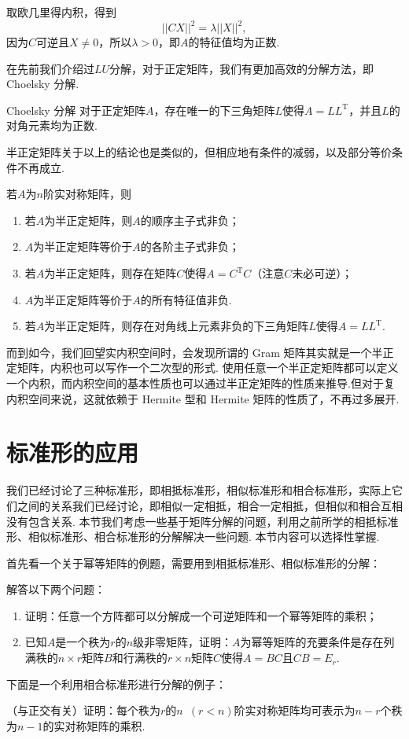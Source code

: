 取欧几里得内积，得到
\[||CX||^2 = \lambda ||X||^2,\]
因为$C$可逆且$X \neq 0$，所以$\lambda > 0$，即$A$的特征值均为正数.

在先前我们介绍过$LU$分解，对于正定矩阵，我们有更加高效的分解方法，即 Choelsky 分解.

\begin{theorem}{}{Choelsky 分解}
    对于正定矩阵$A$，存在唯一的下三角矩阵$L$使得$A=LL^\mathrm{T}$，并且$L$的对角元素均为正数.
\end{theorem}

半正定矩阵关于以上的结论也是类似的，但相应地有条件的减弱，以及部分等价条件不再成立.
\begin{theorem}{}{}
    若$A$为$n$阶实对称矩阵，则
    \begin{enumerate}
        \item 若$A$为半正定矩阵，则$A$的顺序主子式非负；
        \item $A$为半正定矩阵等价于$A$的各阶主子式非负；
        \item 若$A$为半正定矩阵，则存在矩阵$C$使得$A=C^{\mathrm{T}}C$（注意$C$未必可逆）；
        \item $A$为半正定矩阵等价于$A$的所有特征值非负.
        \item 若$A$为半正定矩阵，则存在对角线上元素非负的下三角矩阵$L$使得$A=LL^{\mathrm{T}}$.
    \end{enumerate}
\end{theorem}

而到如今，我们回望实内积空间时，会发现所谓的 Gram 矩阵其实就是一个半正定矩阵，内积也可以写作一个二次型的形式. 使用任意一个半正定矩阵都可以定义一个内积，而内积空间的基本性质也可以通过半正定矩阵的性质来推导.但对于复内积空间来说，这就依赖于 Hermite 型和 Hermite 矩阵的性质了，不再过多展开.

\section{标准形的应用}

我们已经讨论了三种标准形，即相抵标准形，相似标准形和相合标准形，实际上它们之间的关系我们已经讨论，即相似一定相抵，相合一定相抵，但相似和相合互相没有包含关系. 本节我们考虑一些基于矩阵分解的问题，利用之前所学的相抵标准形、相似标准形、相合标准形的分解解决一些问题. 本节内容可以选择性掌握.

首先看一个关于幂等矩阵的例题，需要用到相抵标准形、相似标准形的分解：
\begin{example}{}{}
    解答以下两个问题：
    \begin{enumerate}
        \item 证明：任意一个方阵都可以分解成一个可逆矩阵和一个幂等矩阵的乘积；

        \item 已知$A$是一个秩为$r$的$n$级非零矩阵，证明：$A$为幂等矩阵的充要条件是存在列满秩的$n\times r$矩阵$B$和行满秩的$r\times n$矩阵$C$使得$A=BC$且$CB=E_r$.
    \end{enumerate}
\end{example}
下面是一个利用相合标准形进行分解的例子：
\begin{example}{}{}
    （与正交有关）证明：每个秩为$r$的$n\enspace(r<n)$阶实对称矩阵均可表示为$n-r$个秩为$n-1$的实对称矩阵的乘积.
\end{example}

